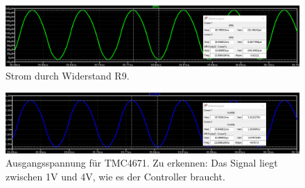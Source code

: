 \begin{figure}[h!]
	\centering
	\includegraphics[width=\textwidth]{graphics/Strom_Ir_4.png}
	\caption{Strom durch Widerstand R9.}
	\label{fig:Simulation_Op3_2}
\end{figure}

\begin{figure}[h!]
	\centering
	\includegraphics[width=\textwidth]{graphics/Spannung_Ua_4.png}
	\caption{Ausgangsspannung für TMC4671. Zu erkennen: Das Signal liegt zwischen 1V und 4V, wie es der Controller braucht.}
	\label{fig:Simulation_Op3_3}
\end{figure}


